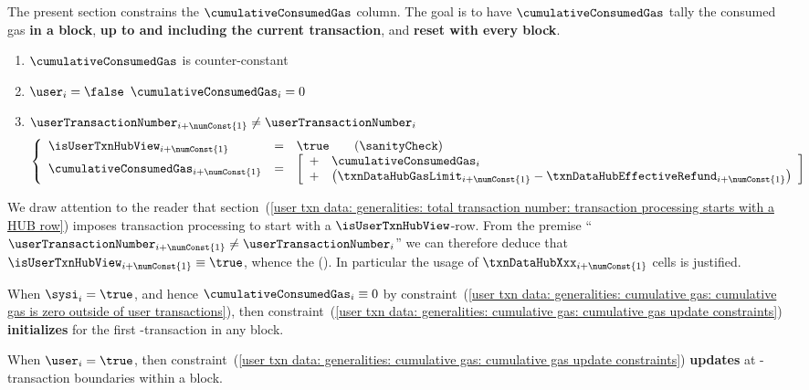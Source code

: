 \def\locFirstRowOfNewTransactionRoff {\numConst{1}}
The present section constrains the $\cumulativeConsumedGas$ column.
The goal is to have $\cumulativeConsumedGas$
tally the consumed gas \textbf{in a block},
\textbf{up to and including the current transaction},
and \textbf{reset with every block}.
\begin{enumerate}
	\item
		$\cumulativeConsumedGas$ is counter-constant
	\item
		\label{user txn data: generalities: cumulative gas: cumulative gas is zero outside of user transactions}
		\If $\user _{i} = \false$ \Then $\cumulativeConsumedGas _{i} = 0$
	\item
		\label{user txn data: generalities: cumulative gas: cumulative gas update constraints}
		\If $\userTransactionNumber _{i + \locFirstRowOfNewTransactionRoff} \neq \userTransactionNumber _{i}$ \Then
		\[
			\left\{ \begin{array}{lcl}
				\isUserTxnHubView      _{i + \locFirstRowOfNewTransactionRoff} & = & \true \qquad (\sanityCheck) \\
				\cumulativeConsumedGas _{i + \locFirstRowOfNewTransactionRoff} & = &
				\left[ \begin{array}{ll}
					+ & \cumulativeConsumedGas    _{i}                                                 \\
					+ & \big( \txnDataHubGasLimit _{i + \locFirstRowOfNewTransactionRoff} - \txnDataHubEffectiveRefund _{i + \locFirstRowOfNewTransactionRoff} \big) \\
				\end{array}\right] \\
			\end{array} \right.
		\]
\end{enumerate}
\saNote{}
We draw attention to the reader that
section~(\ref{user txn data: generalities: total transaction number: transaction processing starts with a HUB row})
imposes transaction processing to start with a $\isUserTxnHubView$-row.
From the premise ``$\userTransactionNumber _{i + \locFirstRowOfNewTransactionRoff} \neq \userTransactionNumber _{i}$''
we can therefore deduce that $\isUserTxnHubView _{i + \locFirstRowOfNewTransactionRoff} \equiv \true$,
whence the (\sanityCheck).
In particular the usage of $\txnDataHubXxx _{i + \locFirstRowOfNewTransactionRoff}$ cells is justified.

\saNote{}
When $\sysi _{i} = \true$, and hence $\cumulativeConsumedGas _{i} \equiv 0$
by constraint~(\ref{user txn data: generalities: cumulative gas: cumulative gas is zero outside of user transactions}),
then
constraint~(\ref{user txn data: generalities: cumulative gas: cumulative gas update constraints})
\textbf{initializes} \cumulativeConsumedGas{} for the first \user{}-transaction in any block.

\saNote{}
When $\user _{i} = \true$,
then
constraint~(\ref{user txn data: generalities: cumulative gas: cumulative gas update constraints})
\textbf{updates} \cumulativeConsumedGas{} at \user{}-transaction boundaries within a block.

